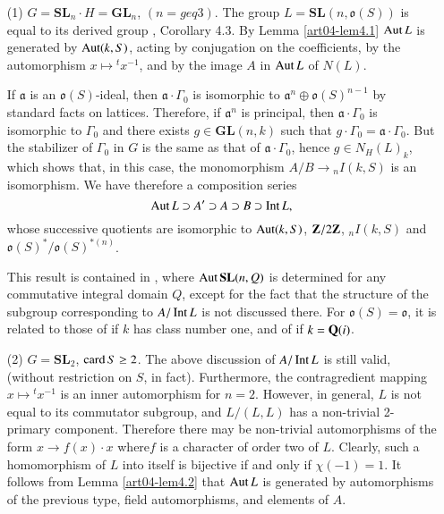\begin{examples}\label{art04-exams4.6}
\begin{itemize}
\item[(1)] $G=\mathbf{SL}_{n}\cdot H=\mathbf{GL}_{n}$, $(n=geq 3)$. The group $L=\mathbf{SL}(n,\mathfrak{o}(S))$ is equal to its derived group \cite{art04-key3}, Corollary 4.3. By Lemma \ref{art04-lem4.1} $\operatorname{\mathrm{Aut}} L$ is generated by $\operatorname{\mathrm{Aut}} (k,S)$, acting by conjugation on the coefficients, by the automorphism $x\mapsto {}^{t}x^{-1}$, and by the image $A$ in $\operatorname{\mathrm{Aut}} L$ of $N(L)$.

If $\mathfrak{a}$ is an $\mathfrak{o}(S)$-ideal, then $\mathfrak{a}\cdot \Gamma_{0}$ is isomorphic to $\mathfrak{a}^{n}\oplus \mathfrak{o}(S)^{n-1}$ by standard facts on lattices. Therefore, if $\mathfrak{a}^{n}$ is principal, then $\mathfrak{a}\cdot \Gamma_{0}$ is isomorphic to $\Gamma_{0}$ and there exists $g\in \mathbf{GL}(n,k)$ such that $g\cdot \Gamma_{0}=\mathfrak{a}\cdot \Gamma_{0}$. But the stabilizer of $\Gamma_{0}$ in $G$ is the same as that of $\mathfrak{a}\cdot \Gamma_{0}$, hence $g\in N_{H}(L)_{k}$, which shows that, in this case, the monomorphism $A/B\to {}_{n}I(k,S)$ is an isomorphism. We have therefore a composition series
$$
\operatorname{\mathrm{Aut}} L\supset A'\supset A\supset B\supset \operatorname{\mathrm{Int}} L,
$$
whose successive quotients are isomorphic to $\operatorname{\mathrm{Aut}}(k,S)$, $\mathbf{Z}/2\mathbf{Z}$, ${}_{n}I(k,S)$ and $\mathfrak{o}(S)^{*}/\mathfrak{o}(S)^{*(n)}$.

This result is contained in \cite{art04-key24}, where $\operatorname{\mathrm{Aut}} \mathbf{SL}(n,Q)$ is determined for any commutative integral domain $Q$, except for the fact that the structure of the subgroup corresponding to $A/\operatorname{\mathrm{Int}} L$ is not discussed there. For $\mathfrak{o}(S)=\mathfrak{o}$, it is related to those of \cite{art04-key19} if $k$ has class number one, and of \cite{art04-key20} if $k=\mathbf{Q}(i)$.

\item[(2)] $G=\mathbf{SL}_{2}$, $\operatorname{\mathrm{card}} S\geq 2$. The above discussion of $A/\operatorname{\mathrm{Int}} L$ is still valid, (without restriction on $S$, in fact). Furthermore, the contragredient mapping $x\mapsto {}^{t}x^{-1}$ is an inner automorphism for $n=2$. However, in general, $L$ is not equal to its commutator subgroup, and $L/(L,L)$ has a non-trivial 2-primary component. Therefore there may be non-trivial automorphisms of the form $x\to f(x)\cdot x$ where\pageoriginale $f$ is a character of order two of $L$. Clearly, such a homomorphism of $L$ into itself is bijective if and only if $\chi(-1)=1$. It follows from Lemma \ref{art04-lem4.2} that $\operatorname{\mathrm{Aut}} L$ is generated by automorphisms of the previous type, field automorphisms, and elements of $A$.


\end{itemize}
\end{examples}
